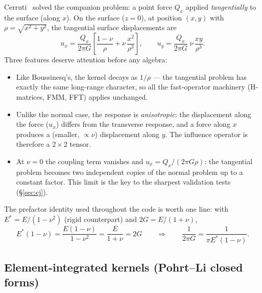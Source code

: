 \documentclass[11pt,a4paper]{article}
\newcommand{\Estar}{E^{*}}
\begin{document}
Cerruti~\cite{Cerruti1882} solved the companion problem: a point force $Q_x$
applied \emph{tangentially} to the surface (along $x$). On the surface
($z=0$), at position $(x,y)$ with $\rho = \sqrt{x^2 + y^2}$, the tangential
surface displacements are
\begin{equation}
  u_x = \frac{Q_x}{2\pi G}\left[ \frac{1-\nu}{\rho}
        + \nu\,\frac{x^2}{\rho^3} \right],
  \qquad
  u_y = \frac{Q_x}{2\pi G}\; \nu\,\frac{x y}{\rho^3}.
  \label{eq:cerruti-point}
\end{equation}
Three features deserve attention before any algebra:
\begin{itemize}
\item Like Boussinesq's, the kernel decays as $1/\rho$ --- the tangential
  problem has exactly the same long-range character, so all the fast-operator
  machinery (H-matrices, FMM, FFT) applies unchanged.
\item Unlike the normal case, the response is \emph{anisotropic}: the
  displacement along the force ($u_x$) differs from the transverse response,
  and a force along $x$ produces a (smaller, $\propto \nu$) displacement
  along $y$. The influence operator is therefore a $2\times2$ tensor.
\item At $\nu = 0$ the coupling term vanishes and
  $u_x = Q_x/(2\pi G \rho)$: the tangential problem becomes two independent
  copies of the normal problem up to a constant factor. This limit is the
  key to the sharpest validation tests (\S\ref{sec:cj}).
\end{itemize}
The prefactor identity used throughout the code is worth one line: with
$\Estar = E/(1-\nu^2)$ (rigid counterpart) and $2G = E/(1+\nu)$,
\begin{equation}
  \Estar(1-\nu) = \frac{E(1-\nu)}{1-\nu^2} = \frac{E}{1+\nu} = 2G
  \qquad\Longrightarrow\qquad
  \frac{1}{2\pi G} = \frac{1}{\pi \Estar (1-\nu)} .
  \label{eq:prefactor}
\end{equation}

\subsection{Element-integrated kernels (Pohrt--Li closed forms)}
\label{sec:element}
\end{document}
